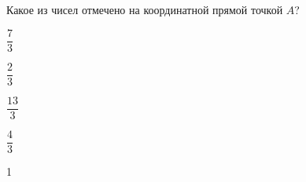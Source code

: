 \begin{ex}
	Какое из чисел отмечено на координатной прямой точкой $A$?
	\selectanswer
	\begin{enumcols}[columns=4]
		\item $\dfrac{7}{3}$
		\item $\dfrac{2}{3}$
		\item $\dfrac{13}{3}$
		\item $\dfrac{4}{3}$
	\end{enumcols}
	\begin{answer}
		1
	\end{answer}
\end{ex}
